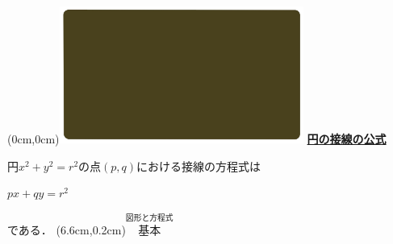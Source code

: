 \documentclass[10pt,
fleqn,
dvipdfmx,
uplatex
]{jsarticle}
\begin{document}
\at(0cm,0cm){\includegraphics[width=8cm,bb=0 0 1920 1080]{./youtube/thumbnails/templates/smart_background/図形と方程式.jpeg}}
{\color{orange}\bf\boldmath\huge\underline{円の接線の公式}}\vspace{0.3zw}

\vspace{0.4zw}
円$x^2+y^2=r^2$の点$(p,q)$における接線の方程式は

\HUGE
\vspace{-0.4zw}
\hspace{0.2zw}
$px+qy=r^2$

\large
\vspace{0.5zw}
\hfill
である．
\at(6.6cm,0.2cm){\small\color{bradorange}$\overset{\text{図形と方程式}}{\text{基本}}$}
\end{document}

